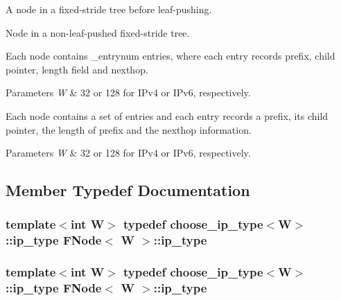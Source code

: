 A node in a fixed-\/stride tree before leaf-\/pushing. 

Node in a non-\/leaf-\/pushed fixed-\/stride tree.

Each node contains \-\_\-entrynum entries, where each entry records prefix, child pointer, length field and nexthop.


\begin{DoxyParams}{Parameters}
{\em W} & 32 or 128 for I\-Pv4 or I\-Pv6, respectively.\\
\hline
\end{DoxyParams}
Each node contains a set of entries and each entry records a prefix, its child pointer, the length of prefix and the nexthop information.


\begin{DoxyParams}{Parameters}
{\em W} & 32 or 128 for I\-Pv4 or I\-Pv6, respectively. \\
\hline
\end{DoxyParams}


\subsection{Member Typedef Documentation}
\hypertarget{structFNode_ae4ae2a97d6351584e0860a25b545cf94}{
\subsubsection[{ip\-\_\-type}]{\setlength{\rightskip}{0pt plus 5cm}template$<$int W$>$ typedef {\bf choose\-\_\-ip\-\_\-type}$<${\bf W}$>$\-::{\bf ip\-\_\-type} {\bf F\-Node}$<$ {\bf W} $>$\-::{\bf ip\-\_\-type}}}\label{structFNode_ae4ae2a97d6351584e0860a25b545cf94}
\hypertarget{structFNode_ae4ae2a97d6351584e0860a25b545cf94}{
\subsubsection[{ip\-\_\-type}]{\setlength{\rightskip}{0pt plus 5cm}template$<$int W$>$ typedef {\bf choose\-\_\-ip\-\_\-type}$<${\bf W}$>$\-::{\bf ip\-\_\-type} {\bf F\-Node}$<$ {\bf W} $>$\-::{\bf ip\-\_\-type}}}\label{structFNode_ae4ae2a97d6351584e0860a25b545cf94}


